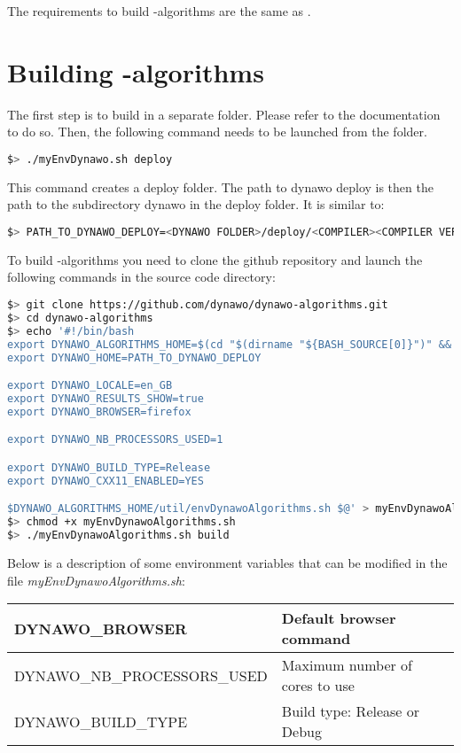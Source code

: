 \documentclass[a4paper, 12pt]{report}
\begin{document}
The requirements to build \Dynawo-algorithms are the same as \Dynawo.

\section[Building Dynawo-algorithms]{Building \Dynawo-algorithms}
\label{Dynawo_algorithms_Installation_Documentation_Building_Dynawo_algorithm}
The first step is to build \Dynawo in a separate folder. Please refer to the \Dynawo documentation to do so.
Then, the following command needs to be launched from the \Dynawo folder.

\begin{lstlisting}[language=bash]
$> ./myEnvDynawo.sh deploy
\end{lstlisting}

This command creates a deploy folder. The path to dynawo deploy is then the path to the subdirectory dynawo in the deploy folder. It is similar to:

\begin{lstlisting}[language=bash]
$> PATH_TO_DYNAWO_DEPLOY=<DYNAWO FOLDER>/deploy/<COMPILER><COMPILER VERSION>/shared/dynawo/
\end{lstlisting}

To build \Dynawo-algorithms you need to clone the github repository and launch the following commands in the source code directory:

\begin{lstlisting}[language=bash]
$> git clone https://github.com/dynawo/dynawo-algorithms.git
$> cd dynawo-algorithms
$> echo '#!/bin/bash
export DYNAWO_ALGORITHMS_HOME=$(cd "$(dirname "${BASH_SOURCE[0]}")" && pwd)
export DYNAWO_HOME=PATH_TO_DYNAWO_DEPLOY

export DYNAWO_LOCALE=en_GB
export DYNAWO_RESULTS_SHOW=true
export DYNAWO_BROWSER=firefox

export DYNAWO_NB_PROCESSORS_USED=1

export DYNAWO_BUILD_TYPE=Release
export DYNAWO_CXX11_ENABLED=YES

$DYNAWO_ALGORITHMS_HOME/util/envDynawoAlgorithms.sh $@' > myEnvDynawoAlgorithms.sh
$> chmod +x myEnvDynawoAlgorithms.sh
$> ./myEnvDynawoAlgorithms.sh build
\end{lstlisting}

Below is a description of some environment variables that can be modified in the file \textit{myEnvDynawoAlgorithms.sh}:

\begin{center}
\begin{tabular}{|l|l|}
  \hline
   DYNAWO\_BROWSER & Default browser command \\
  \hline
   DYNAWO\_NB\_PROCESSORS\_USED & Maximum number of cores to use \\
  \hline
   DYNAWO\_BUILD\_TYPE & Build type: Release or Debug \\
  \hline
\end{tabular}
\end{center}
\end{document}
